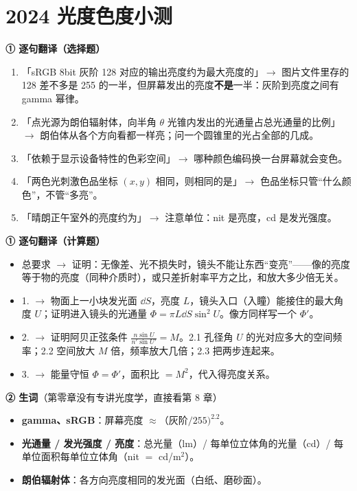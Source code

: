 \section{2024 光度色度小测}\label{sec:quiz2024}
\label{rd:quiz2024}
\begin{idea}[读题：这道题在说什么]
\textbf{① 逐句翻译（选择题）}
\begin{enumerate}
\item 「sRGB 8bit 灰阶 128 对应的输出亮度约为最大亮度的」$\to$ 图片文件里存的 128 差不多是 255 的一半，但屏幕发出的亮度\textbf{不是}一半：灰阶到亮度之间有 gamma 幂律。
\item 「点光源为朗伯辐射体，向半角 $\theta$ 光锥内发出的光通量占总光通量的比例」$\to$ 朗伯体从各个方向看都一样亮；问一个圆锥里的光占全部的几成。
\item 「依赖于显示设备特性的色彩空间」$\to$ 哪种颜色编码换一台屏幕就会变色。
\item 「两色光刺激色品坐标 $(x,y)$ 相同，则相同的是」$\to$ 色品坐标只管“什么颜色”，不管“多亮”。
\item 「晴朗正午室外的亮度约为」$\to$ 注意单位：nit 是亮度，cd 是发光强度。
\end{enumerate}
\textbf{① 逐句翻译（计算题）}
\begin{itemize}
\item 总要求 $\to$ 证明：无像差、光不损失时，镜头不能让东西“变亮”——像的亮度等于物的亮度（同种介质时），或只差折射率平方之比，和放大多少倍无关。
\item 1. $\to$ 物面上一小块发光面 $\dd S$，亮度 $L$，镜头入口（入瞳）能接住的最大角度 $U$；证明进入镜头的光通量 $\Phi=\pi L\dd S\sin^2U$。像方同样写一个 $\Phi'$。
\item 2. $\to$ 证明阿贝正弦条件 $\frac{n\sin U}{n'\sin U'}=M$。2.1 孔径角 $U$ 的光对应多大的空间频率；2.2 空间放大 $M$ 倍，频率放大几倍；2.3 把两步连起来。
\item 3. $\to$ 能量守恒 $\Phi=\Phi'$，面积比 $=M^2$，代入得亮度关系。
\end{itemize}
\textbf{② 生词}（第零章没有专讲光度学，直接看第 8 章）
\begin{itemize}
\item \textbf{gamma、sRGB}：屏幕亮度 $\approx$（灰阶$/255)^{2.2}$。
\item \textbf{光通量 / 发光强度 / 亮度}：总光量（lm）/ 每单位立体角的光量（cd）/ 每单位面积每单位立体角（nit $=$ cd/m$^2$）。
\item \textbf{朗伯辐射体}：各方向亮度相同的发光面（白纸、磨砂面）。

\end{itemize}
\end{idea}
